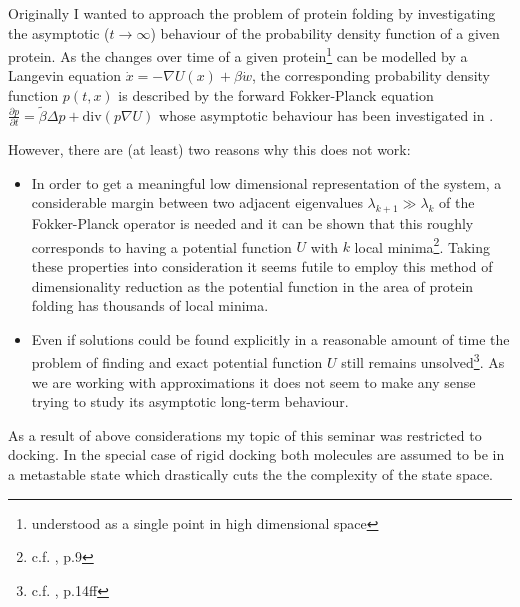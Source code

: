 Originally I wanted to approach the problem of protein folding by investigating the asymptotic ($t\rightarrow\infty$) behaviour of the probability density function of a given protein. As the changes over time of a given protein\footnote{understood as a single point in high dimensional space} can be modelled by a Langevin equation $\dot x = -\nabla U(x)+\beta\dot w$, the corresponding probability density function $p(t,x)$ is described by the forward Fokker-Planck equation $\frac{\partial p}{\partial t} = \tilde\beta \Delta p + \text{div}(p\nabla U)$ whose asymptotic behaviour has been investigated in \cite{Nadler2008}.

However, there are (at least) two reasons why this does not work:
\begin{itemize}
	\item In order to get a meaningful low dimensional representation of the system, a considerable margin between two adjacent eigenvalues $\lambda_{k+1} \gg \lambda_k$ of the Fokker-Planck operator is needed and it can be shown that this roughly corresponds to having a potential function $U$ with $k$ local minima\footnote{c.f. \cite{Nadler2008}, p.9}. Taking these properties into consideration it seems futile to employ this method of dimensionality reduction as the potential function in the area of protein folding has thousands of local minima.
	\item Even if solutions could be found explicitly in a reasonable amount of time the problem of finding and exact potential function $U$ still remains unsolved\footnote{c.f. \cite{Neumaier97}, p.14ff}. As we are working with approximations it does not seem to make any sense trying to study its asymptotic long-term behaviour.
\end{itemize}

As a result of above considerations my topic of this seminar was restricted to docking. In the special case of rigid docking both molecules are assumed to be in a metastable state which drastically cuts the the complexity of the state space.